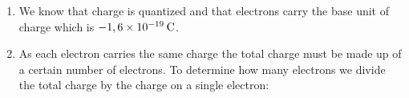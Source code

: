 {\begin{mdframed}[linewidth=4, leftmargin=40, rightmargin=40]
\begin{exercise}
\begin{enumerate}[noitemsep, label=\textbf{Step} \textbf{\arabic*}. ]
 So each sphere now has: 
\label{m38781*id61212}\nopagebreak\noindent{}
     of charge.\item \newline
     We know that charge is quantized and that electrons carry the base unit of charge which is \begin{math}-1,6\ensuremath{\times}{10}^{-19}\phantom{\rule{2pt}{0ex}}\mathrm{C}\end{math}.\item \newline
     As each electron carries the same charge the total charge must be made up of a certain number of electrons. To determine how many electrons we divide the total charge by the charge on a single electron:
\label{m38781*id5121}\nopagebreak\noindent{}
\end{enumerate}
\end{exercise}
\end{mdframed}}
